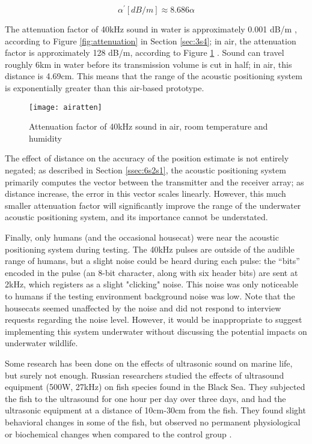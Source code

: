 \documentclass[12pt,a4paper]{report}
\begin{document}
\begin{equation} \label{eq:6eq3}
	\alpha^{'} [dB/m] \approx 8.686 \alpha
\end{equation}

The attenuation factor of 40kHz sound in water is approximately 0.001 dB/m \cite{computational}, according to Figure \ref{fig:attenuation} in Section \ref{sec:3s4}; in air, the attenuation factor is approximately 128 dB/m, according to Figure \ref{fig:airatten} \cite{airatten}. Sound can travel roughly 6km in water before its transmission volume is cut in half; in air, this distance is 4.69cm. This means that the range of the acoustic positioning system is exponentially greater than this air-based prototype. 

\begin{figure}[htbp]
	\centering
	\texttt{[image: airatten]}
	\caption{Attenuation factor of 40kHz sound in air, room temperature and humidity \cite{airatten}}
	\label{fig:airatten}
\end{figure}

The effect of distance on the accuracy of the position estimate is not entirely negated; as described in Section \ref{ssec:6s2s1}, the acoustic positioning system primarily computes the vector between the transmitter and the receiver array; as distance increase, the error in this vector scales linearly. However, this much smaller attenuation factor will significantly improve the range of the underwater acoustic positioning system, and its importance cannot be understated.

Finally, only humans (and the occasional housecat) were near the acoustic positioning system during testing. The 40kHz pulses are outside of the audible range of humans, but a slight noise could be heard during each pulse: the “bits” encoded in the pulse (an 8-bit character, along with six header bits) are sent at 2kHz, which registers as a slight "clicking" noise. This noise was only noticeable to humans if the testing environment background noise was low. Note that the housecats seemed unaffected by the noise and did not respond to interview requests regarding the noise level. However, it would be inappropriate to suggest implementing this system underwater without discussing the potential impacts on underwater wildlife.

Some research has been done on the effects of ultrasonic sound on marine life, but surely not enough. Russian researchers studied the effects of ultrasound equipment (500W, 27kHz) on fish species found in the Black Sea. They subjected the fish to the ultrasound for one hour per day over three days, and had the ultrasonic equipment at a distance of 10cm-30cm from the fish. They found slight behavioral changes in some of the fish, but observed no permanent physiological or biochemical changes when compared to the control group \cite{blacksea}.
\end{document}
